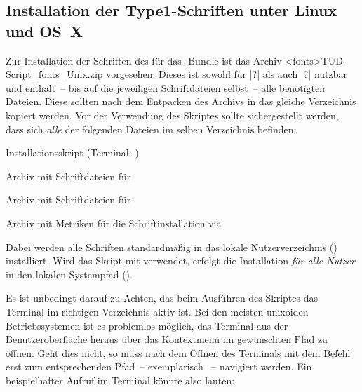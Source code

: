 \subsection{Installation der Type1-Schriften unter Linux und OS~X}
%
%
Zur Installation der Schriften des \CDs für das \TUDScript-Bundle ist das 
Archiv \GitHubDownload<fonts>{TUD-Script_fonts_Unix.zip} vorgesehen. Dieses ist 
sowohl für |?| als auch 
|?| nutzbar und enthält~-- bis auf die jeweiligen 
Schriftdateien selbst~-- alle benötigten Dateien. Diese sollten nach dem 
Entpacken des Archivs in das gleiche Verzeichnis kopiert werden. Vor der 
Verwendung des Skriptes  sollte sichergestellt 
werden, dass sich \emph{alle} der folgenden Dateien im selben Verzeichnis 
befinden:
%
\begin{description}[labelwidth=\tempdim,labelsep=1em]
  \item[\File{tudscr_fonts_install.sh}]Installationsskript
    (Terminal: )
  \item[\File{Univers_PS.zip}]Archiv mit Schriftdateien für \Univers
  \item[\File{DIN_Bd_PS.zip}]Archiv mit Schriftdateien für \DIN
  \item[\File{tudscr_fonts_install.zip}]Archiv mit Metriken für die
    Schriftinstallation via 
\end{description}
%
Dabei werden alle Schriften standardmäßig in das lokale Nutzerverzeichnis 
() installiert. Wird das Skript mit  verwendet, 
erfolgt die Installation \emph{für alle Nutzer} in den lokalen Systempfad 
().

Es ist unbedingt darauf zu Achten, das beim Ausführen des Skriptes das Terminal 
im richtigen Verzeichnis aktiv ist. Bei den meisten unixoiden Betriebssystemen 
ist es problemlos möglich, das Terminal aus der Benutzeroberfläche heraus über 
das Kontextmenü im gewünschten Pfad zu öffnen. Geht dies nicht, so muss nach 
dem Öffnen des Terminals mit dem Befehl  erst zum entsprechenden 
Pfad~-- exemplarisch ~-- 
navigiert werden. Ein beispielhafter Aufruf im Terminal könnte also lauten:
%
\begin{quoting}
\newline
{}
\end{quoting}


